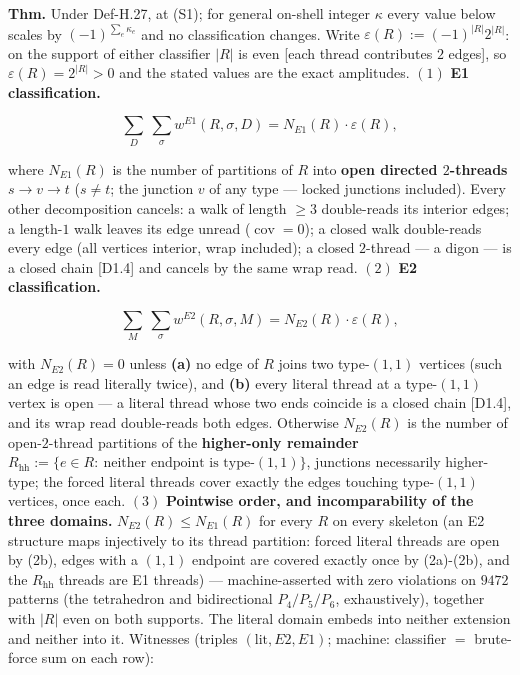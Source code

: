 \begin{theorem}\label{tag:FT-74}
\textbf{Thm.} Under Def-H.27, at (S1); for general on-shell integer $\kappa$ every value below scales by $(-1)^{\sum_e\kappa_e}$ and no classification changes. Write $\varepsilon(R):=(-1)^{|R|}2^{|R|}$: on the support of either classifier $|R|$ is even [each thread contributes $2$ edges], so $\varepsilon(R)=2^{|R|}>0$ and the stated values are the exact amplitudes. $(1)$ \textbf{E1 classification.}

\[
\sum_D\ \sum_\sigma w^{E1}(R,\sigma,D)=N_{E1}(R)\cdot\varepsilon(R),
\]

where $N_{E1}(R)$ is the number of partitions of $R$ into \textbf{open directed $2$-threads} $s\to v\to t$ ($s\ne t$; the junction $v$ of any type — locked junctions included). Every other decomposition cancels: a walk of length $\ge3$ double-reads its interior edges; a length-$1$ walk leaves its edge unread ($\operatorname{cov}=0$); a closed walk double-reads every edge (all vertices interior, wrap included); a closed $2$-thread — a digon — is a closed chain [D1.4] and cancels by the same wrap read. $(2)$ \textbf{E2 classification.}

\[
\sum_M\ \sum_\sigma w^{E2}(R,\sigma,M)=N_{E2}(R)\cdot\varepsilon(R),
\]

with $N_{E2}(R)=0$ unless \textbf{(a)} no edge of $R$ joins two type-$(1,1)$ vertices (such an edge is read literally twice), and \textbf{(b)} every literal thread at a type-$(1,1)$ vertex is open — a literal thread whose two ends coincide is a closed chain [D1.4], and its wrap read double-reads both edges. Otherwise $N_{E2}(R)$ is the number of open-$2$-thread partitions of the \textbf{higher-only remainder} $R_{\mathrm{hh}}:=\{e\in R:\ \text{neither endpoint is type-}(1,1)\}$, junctions necessarily higher-type; the forced literal threads cover exactly the edges touching type-$(1,1)$ vertices, once each. $(3)$ \textbf{Pointwise order, and incomparability of the three domains.} $N_{E2}(R)\le N_{E1}(R)$ for every $R$ on every skeleton (an E2 structure maps injectively to its thread partition: forced literal threads are open by (2b), edges with a $(1,1)$ endpoint are covered exactly once by (2a)-(2b), and the $R_{\mathrm{hh}}$ threads are E1 threads) — machine-asserted with zero violations on $9472$ patterns (the tetrahedron and bidirectional $P_4/P_5/P_6$, exhaustively), together with $|R|$ even on both supports. The literal domain embeds into neither extension and neither into it. Witnesses (triples $(\mathrm{lit},E2,E1)$; machine: classifier $=$ brute-force sum on each row):


\end{theorem}
